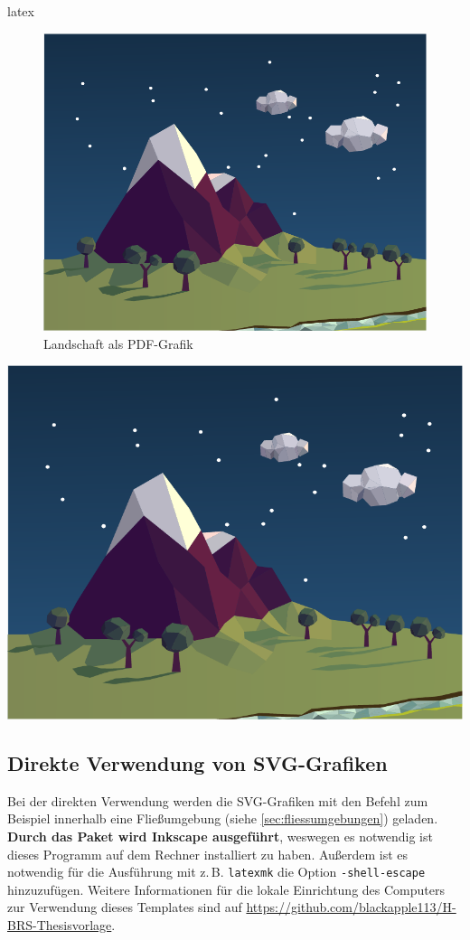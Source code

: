 \begin{showcase}
    \begin{code}{latex}
        \begin{figure}
            \centering
            \includegraphics[width=0.5\columnwidth]{assets/images/bilder/landscape.pdf}
            \caption{Landschaft als PDF-Grafik}
            \label{fig:landschaft-als-pdf-grafik}
        \end{figure}        
    \end{code}
    \tcblower
    \begin{center}
        \includegraphics[width=0.5\columnwidth]{assets/images/bilder/landscape.pdf}
        \label{fig:landschaft-als-pdf-grafik}
    \end{center}  
\end{showcase}

\subsection{Direkte Verwendung von SVG-Grafiken}
Bei der direkten Verwendung werden die SVG-Grafiken mit den Befehl \texttt{} zum Beispiel innerhalb eine Fließumgebung (siehe \autoref{sec:fliessumgebungen}) geladen. \textbf{Durch das Paket wird Inkscape ausgeführt}, weswegen es notwendig ist dieses Programm auf dem Rechner installiert zu haben. Außerdem ist es notwendig für die Ausführung mit z.\,B. \texttt{latexmk} die Option \texttt{-shell-escape} hinzuzufügen. Weitere Informationen für die lokale Einrichtung des Computers zur Verwendung dieses Templates sind auf \url{https://github.com/blackapple113/H-BRS-Thesisvorlage}.

